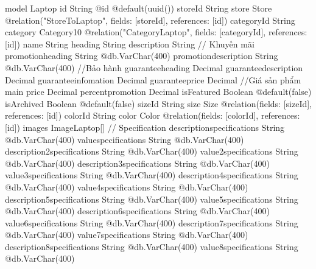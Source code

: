 model Laptop {
  id                          String                       @id @default(uuid())
  storeId                     String
  store                       Store                        @relation("StoreToLaptop", fields: [storeId], references: [id])
  categoryId            String
  category              Category10                   @relation("CategoryLaptop", fields: [categoryId], references: [id])
  name                        String
  heading                     String
  description                 String
  // Khuyến mãi
  promotionheading            String                       @db.VarChar(400)
  promotiondescription        String                       @db.VarChar(400)
  //Bảo hành
  guaranteeheading            Decimal
  guaranteedescription        Decimal
  guaranteeinfomation         Decimal
  guaranteeprice              Decimal
  //Giá sản phẩm main
  price                       Decimal
  percentpromotion            Decimal
  isFeatured                  Boolean                      @default(false)
  isArchived                  Boolean                      @default(false)
  sizeId                      String
  size                        Size                         @relation(fields: [sizeId], references: [id])
  colorId                     String
  color                       Color                        @relation(fields: [colorId], references: [id])
  images                ImageLaptop[]
  // Specification
  descriptionspecifications   String                       @db.VarChar(400)
  valuespecifications         String                       @db.VarChar(400)
  description2specifications  String                       @db.VarChar(400)
  value2specifications        String                       @db.VarChar(400)
  description3specifications  String                       @db.VarChar(400)
  value3specifications        String                       @db.VarChar(400)
  description4specifications  String                       @db.VarChar(400)
  value4specifications        String                       @db.VarChar(400)
  description5specifications  String                       @db.VarChar(400)
  value5specifications        String                       @db.VarChar(400)
  description6specifications  String                       @db.VarChar(400)
  value6specifications        String                       @db.VarChar(400)
  description7specifications  String                       @db.VarChar(400)
  value7specifications        String                       @db.VarChar(400)
  description8specifications  String                       @db.VarChar(400)
  value8specifications        String                       @db.VarChar(400)
}
